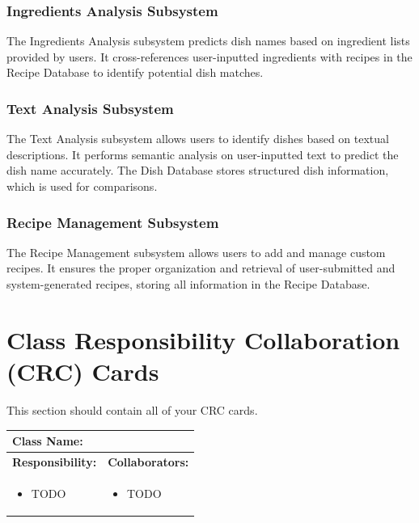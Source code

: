 \documentclass[]{article}
\begin{document}
\subsubsection{Ingredients Analysis Subsystem}
The Ingredients Analysis subsystem predicts dish names based on ingredient lists provided by users. It cross-references user-inputted ingredients with recipes in the Recipe Database to identify potential dish matches.


\subsubsection{Text Analysis Subsystem}
The Text Analysis subsystem allows users to identify dishes based on textual descriptions. It performs semantic analysis on user-inputted text to predict the dish name accurately. The Dish Database stores structured dish information, which is used for comparisons.


\subsubsection{Recipe Management Subsystem}
The Recipe Management subsystem allows users to add and manage custom recipes. It ensures the proper organization and retrieval of user-submitted and system-generated recipes, storing all information in the Recipe Database.


	
\section{Class Responsibility Collaboration (CRC) Cards}
\label{sec:class_responsibility_collaboration_crc_cards}
This section should contain all of your CRC cards.

\begin{table}[H]
	\centering
	\begin{tabular}{|p{7cm}|p{7cm}|}
	\hline 
	 \multicolumn{2}{|l|}{\textbf{Class Name:}} \\
	\hline
	\textbf{Responsibility:} & \textbf{Collaborators:} \\
	\hline
	\raggedright
	\begin{itemize}
		\item TODO
	\end{itemize}
	\vspace{1in} & 
	\begin{itemize}
		\item TODO
	\end{itemize} \\
	\hline
	\end{tabular}
\end{table}
\end{document}
